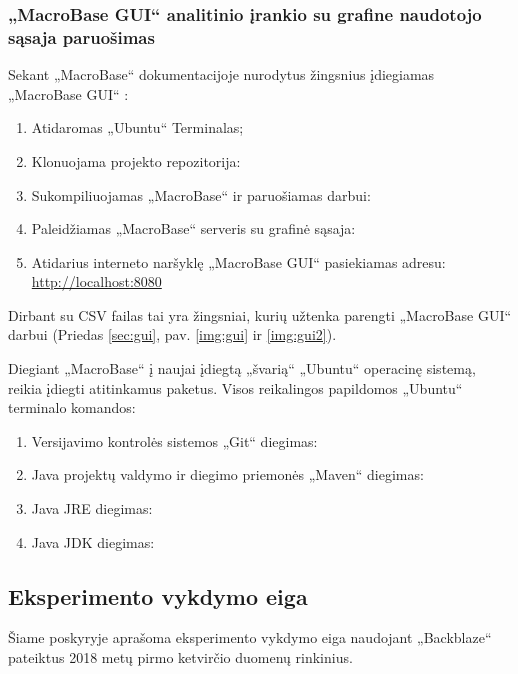 \documentclass{VUMIFPSkursinis}
\begin{document}
\subsubsection{„MacroBase GUI“ analitinio įrankio su grafine naudotojo sąsaja paruošimas}
Sekant „MacroBase“ dokumentacijoje nurodytus žingsnius įdiegiamas „MacroBase GUI“ \cite{macrobase_doc}:
\begin{enumerate}
\item Atidaromas „Ubuntu“ Terminalas;
\item Klonuojama projekto repozitorija:\\
\item Sukompiliuojamas „MacroBase“ ir paruošiamas darbui:\\
\item Paleidžiamas „MacroBase“ serveris su grafinė sąsaja:\\
\item Atidarius interneto naršyklę „MacroBase GUI“ pasiekiamas adresu: \\\url{http://localhost:8080}
\end{enumerate}
Dirbant su CSV failas tai yra žingsniai, kurių užtenka parengti „MacroBase GUI“ darbui (Priedas \ref{sec:gui}, pav. \ref{img:gui} ir \ref{img:gui2}).

Diegiant „MacroBase“ į naujai įdiegtą „švarią“ „Ubuntu“ operacinę sistemą, reikia įdiegti atitinkamus paketus. Visos reikalingos papildomos „Ubuntu“ terminalo komandos:
\begin{enumerate}
\item Versijavimo kontrolės sistemos „Git“ \cite{git} diegimas:\\
\item Java projektų valdymo ir diegimo priemonės „Maven“ \cite{maven} diegimas:\\
\item Java JRE \cite{jre_jdk} diegimas:\\
\item Java JDK \cite{jre_jdk} diegimas:\\
\end{enumerate}

\subsection{Eksperimento vykdymo eiga}
Šiame poskyryje aprašoma eksperimento vykdymo eiga naudojant „Backblaze“ pateiktus 2018 metų pirmo ketvirčio duomenų rinkinius. 
\end{document}
